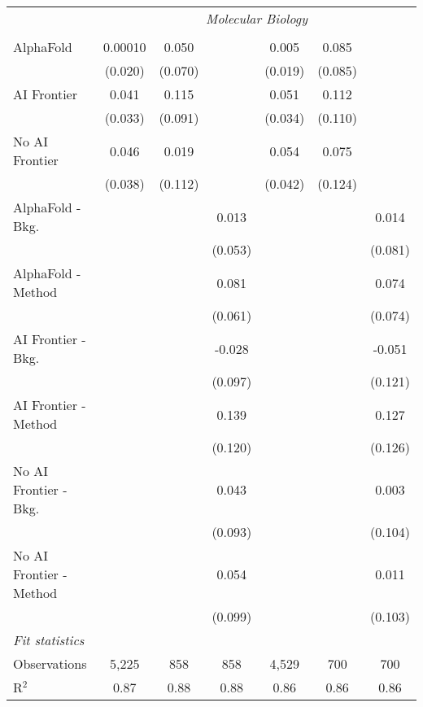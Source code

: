 \begin{tabular}{lcccccc}
 & \multicolumn{6}{c}{\textit{Molecular Biology}} \\ \\
   AlphaFold               & 0.00010 & 0.050   &         & 0.005   & 0.085   &   \\   
                           & (0.020) & (0.070) &         & (0.019) & (0.085) &   \\   
   AI Frontier             & 0.041   & 0.115   &         & 0.051   & 0.112   &   \\   
                           & (0.033) & (0.091) &         & (0.034) & (0.110) &   \\   
   No AI Frontier          & 0.046   & 0.019   &         & 0.054   & 0.075   &   \\   
                           & (0.038) & (0.112) &         & (0.042) & (0.124) &   \\   
   AlphaFold - Bkg.        &         &         & 0.013   &         &         & 0.014\\   
                           &         &         & (0.053) &         &         & (0.081)\\   
   AlphaFold - Method      &         &         & 0.081   &         &         & 0.074\\   
                           &         &         & (0.061) &         &         & (0.074)\\   
   AI Frontier - Bkg.      &         &         & -0.028  &         &         & -0.051\\   
                           &         &         & (0.097) &         &         & (0.121)\\   
   AI Frontier - Method    &         &         & 0.139   &         &         & 0.127\\   
                           &         &         & (0.120) &         &         & (0.126)\\   
   No AI Frontier - Bkg.   &         &         & 0.043   &         &         & 0.003\\   
                           &         &         & (0.093) &         &         & (0.104)\\   
   No AI Frontier - Method &         &         & 0.054   &         &         & 0.011\\   
                           &         &         & (0.099) &         &         & (0.103)\\   
   \midrule
   \emph{Fit statistics}\\
   Observations            & 5,225   & 858     & 858     & 4,529   & 700     & 700\\  
   R$^2$                   & 0.87    & 0.88    & 0.88    & 0.86    & 0.86    & 0.86\\  
   

\end{tabular}
